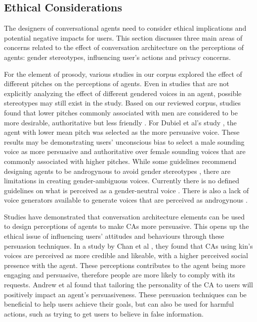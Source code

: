 \subsection{Ethical Considerations}

The designers of conversational agents need to consider ethical implications and potential negative impacts for users. This section discusses three main areas of concerns related to the effect of conversation architecture on the perceptions of agents: gender stereotypes, influencing user's actions and privacy concerns.

For the element of prosody, various studies in our corpus explored the effect of different pitches on the perceptions of agents. Even in studies that are not explicitly analyzing the effect of different gendered voices in an agent, possible stereotypes may still exist in the study. Based on our reviewed corpus, studies found that lower pitches commonly associated with men are considered to be more desirable, authoritative but less friendly \cite{jestin2022effects, tolmeijer2021female}\cmt{[81][62]}. For Dubiel et al's study \cite{dubiel2020persuasive}\cmt{[60]}, the agent with lower mean pitch was selected as the more persuasive voice. These results may be demonstrating users' unconscious bias to select a male sounding voice as more persuasive and authoritative over female sounding voices that are commonly associated with higher pitches. While some guidelines recommend designing agents to be androgynous to avoid gender stereotypes \cite{ruane2019conversational}, there are limitations in creating gender-ambiguous voices. Currently there is no defined guidelines on what is perceived as a gender-neutral voice \cite{jestin2022effects}\cmt{[81]}. There is also a lack of voice generators available to generate voices that are perceived as androgynous \cite{tolmeijer2021female}\cmt{[62]}.

Studies have demonstrated that conversation architecture elements can be used to design perceptions of agents to make CAs more persuasive. This opens up the ethical issue of influencing users' attitudes and behaviours through these persuasion techniques. In a study by Chan et al \cite{chan2021kinvoices}\cmt{[74]}, they found that CAs using kin's voices are perceived as more credible and likeable, with a higher perceived social presence with the agent. These perceptions contributes to the agent being more engaging and persuasive, therefore people are more likely to comply with its requests. Andrew et al \cite{andrews2012system}\cmt{[38]} found that tailoring the personality of the CA to users will positively impact an agent's persuasiveness. These persuasion techniques can be beneficial to help users achieve their goals, but can also be used for harmful actions, such as trying to get users to believe in false information.

